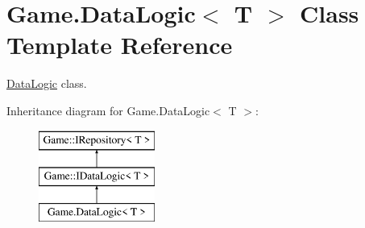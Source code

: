 \hypertarget{class_game_1_1_data_logic}{}\section{Game.\+Data\+Logic$<$ T $>$ Class Template Reference}
\label{class_game_1_1_data_logic}


\mbox{\hyperlink{class_game_1_1_data_logic}{Data\+Logic}} class.  


Inheritance diagram for Game.\+Data\+Logic$<$ T $>$\+:\begin{figure}[H]
\begin{center}
\leavevmode
\includegraphics[height=3.000000cm]{class_game_1_1_data_logic}
\end{center}
\end{figure}
